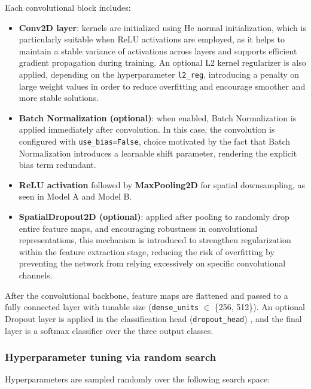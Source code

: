 \documentclass[11pt,a4paper]{article}
\begin{document}
Each convolutional block includes:

\begin{itemize}
    \item \textbf{Conv2D layer}: kernels are initialized using He normal initialization, which is particularly suitable when ReLU activations are employed, as it helps to maintain a stable variance of activations across layers and supports efficient gradient propagation during training. An optional L2 kernel regularizer is also applied, depending on the hyperparameter \texttt{l2\_reg}, introducing a penalty on large weight values in order to reduce overfitting and encourage smoother and more stable solutions.

    \item \textbf{Batch Normalization (optional)}: when enabled, Batch Normalization is applied immediately after convolution.  
    In this case, the convolution is configured with \texttt{use\_bias=False}, choice motivated by the fact that Batch Normalization introduces a learnable shift parameter, rendering the explicit bias term redundant.
    
    \item \textbf{ReLU activation} followed by \textbf{MaxPooling2D} for spatial downsampling, as seen in Model A and Model B.
    
    \item \textbf{SpatialDropout2D (optional)}: applied after pooling to randomly drop entire feature maps, and encouraging robustness in convolutional representations, this mechanism is introduced to strengthen regularization within the feature extraction stage, reducing the risk of overfitting by preventing the network from relying excessively on specific convolutional channels.

\end{itemize}

After the convolutional backbone, feature maps are flattened and passed to a fully connected layer with tunable size (\texttt{dense\_units} $\in$ \{256, 512\}).  
An optional Dropout layer is applied in the classification head (\texttt{dropout\_head}) \cite{keras_dropout}, and the final layer is a softmax classifier over the three output classes.

\subsubsection{Hyperparameter tuning via random search}

Hyperparameters are sampled randomly over the following search space:
\end{document}
